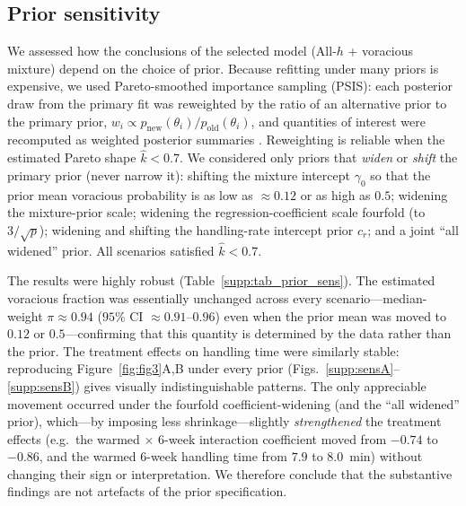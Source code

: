 %   

\subsection{Prior sensitivity}
\label{supp:prior_sensitivity}

We assessed how the conclusions of the selected model (All-$h$ + voracious
mixture) depend on the choice of prior. Because refitting under many priors is
expensive, we used Pareto-smoothed importance sampling (PSIS): each posterior draw
from the primary fit was reweighted by the ratio of an alternative prior to the
primary prior, $w_i \propto p_{\text{new}}(\theta_i)/p_{\text{old}}(\theta_i)$,
and quantities of interest were recomputed as weighted posterior summaries
\citep{vehtariPracticalBayesianModel2017}. Reweighting is reliable when the
estimated Pareto shape $\hat{k} < 0.7$. We considered only priors that
\emph{widen} or \emph{shift} the primary prior (never narrow it): shifting the
mixture intercept $\gamma_0$ so that the prior mean voracious probability is as low
as $\approx 0.12$ or as high as $0.5$; widening the mixture-prior scale; widening
the regression-coefficient scale fourfold (to $3/\sqrt{p}$); widening and shifting
the handling-rate intercept prior $c_r$; and a joint ``all widened'' prior. All
scenarios satisfied $\hat{k} < 0.7$.

The results were highly robust (Table~\ref{supp:tab_prior_sens}). The estimated
voracious fraction was essentially unchanged across every scenario---median-weight
$\pi \approx 0.94$ ($95\%$ CI $\approx 0.91$--$0.96$) even when the prior mean was
moved to $0.12$ or $0.5$---confirming that this quantity is determined by the data
rather than the prior. The treatment effects on handling time were similarly
stable: reproducing Figure~\ref{fig:fig3}A,B under every prior
(Figs.~\ref{supp:sensA}--\ref{supp:sensB}) gives visually indistinguishable
patterns. The only appreciable movement occurred under the fourfold
coefficient-widening (and the ``all widened'' prior), which---by imposing less
shrinkage---slightly \emph{strengthened} the treatment effects (e.g.\ the
warmed $\times$ 6-week interaction coefficient moved from $-0.74$ to $-0.86$, and
the warmed 6-week handling time from $7.9$ to $8.0$~min) without changing their
sign or interpretation. We therefore conclude that the substantive findings are
not artefacts of the prior specification.

